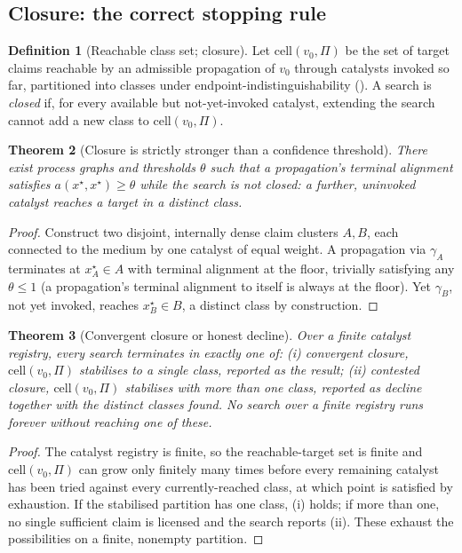 \documentclass[11pt,twocolumn,a4paper]{article}
\theoremstyle{frathm}
\newtheorem{theorem}{Theorem}[section]
\theoremstyle{definition}
\newtheorem{definition}[theorem]{Definition}
\theoremstyle{remark}
\newcommand{\Proc}{\Pi}
\newcommand{\al}{a}
\newcommand{\Cell}{\mathrm{cell}}
\begin{document}
\subsection{Closure: the correct stopping rule}

\begin{definition}[Reachable class set; closure]
\label{def:closure}
Let $\Cell(v_0,\Proc)$ be the set of target claims reachable by an
admissible propagation of $v_0$ through catalysts invoked so far,
partitioned into classes under endpoint-indistinguishability
(). A search is \emph{closed} if, for every
available but not-yet-invoked catalyst, extending the search cannot add a
new class to $\Cell(v_0,\Proc)$.
\end{definition}

\begin{theorem}[Closure is strictly stronger than a confidence threshold]
\label{thm:closure-stronger}
There exist process graphs and thresholds $\theta$ such that a
propagation's terminal alignment satisfies $\al(x^{\star},x^{\star})
\ge\theta$ while the search is not closed: a further, uninvoked catalyst
reaches a target in a distinct class.
\end{theorem}

\begin{proof}
Construct two disjoint, internally dense claim clusters $A,B$, each
connected to the medium by one catalyst of equal weight. A propagation via
$\gamma_A$ terminates at $x^{\star}_A\in A$ with terminal alignment at the
floor, trivially satisfying any $\theta\le1$ (a propagation's terminal
alignment to itself is always at the floor). Yet $\gamma_B$, not yet
invoked, reaches $x^{\star}_B\in B$, a distinct class by construction.
\end{proof}

\begin{theorem}[Convergent closure or honest decline]
\label{thm:decline}
Over a finite catalyst registry, every search terminates in exactly one
of: \textup{(i)} \emph{convergent closure}, $\Cell(v_0,\Proc)$ stabilises
to a single class, reported as the result; \textup{(ii)} \emph{contested
closure}, $\Cell(v_0,\Proc)$ stabilises with more than one class, reported
as \emph{decline} together with the distinct classes found. No search
over a finite registry runs forever without reaching one of these.
\end{theorem}

\begin{proof}
The catalyst registry is finite, so the reachable-target set is finite
and $\Cell(v_0,\Proc)$ can grow only finitely many times before every
remaining catalyst has been tried against every currently-reached class,
at which point  is satisfied by exhaustion. If the
stabilised partition has one class, (i) holds; if more than one, no
single sufficient claim is licensed and the search reports (ii). These
exhaust the possibilities on a finite, nonempty partition.
\end{proof}
\end{document}
